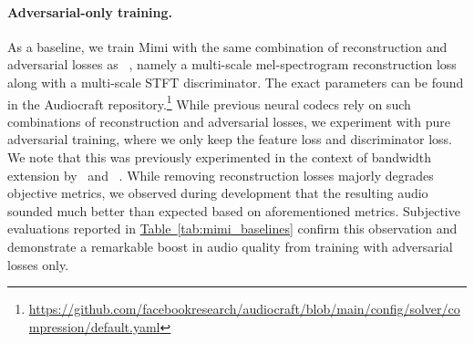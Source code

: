 \paragraph{Adversarial-only training.}
As a baseline, we train Mimi with the same combination of reconstruction and adversarial losses as ~\citet{encodec}, namely a multi-scale mel-spectrogram reconstruction loss along with a multi-scale STFT discriminator. The exact parameters can be found in the Audiocraft repository.\footnote{\url{https://github.com/facebookresearch/audiocraft/blob/main/config/solver/compression/default.yaml}} While previous neural codecs rely on such combinations of reconstruction and adversarial losses, we experiment with pure adversarial training, where we only keep the feature loss and discriminator loss. We note that this was previously experimented in the context of bandwidth extension by~\citet{tagliasacchi2020seanet} and ~\citet{hauret2023eben}. While removing reconstruction losses majorly degrades objective metrics, we observed during development that the resulting audio sounded much better than expected based on aforementioned metrics. Subjective evaluations reported in \hyperref[tab:mimi_baselines]{Table~\ref{tab:mimi_baselines}} confirm this observation and demonstrate a remarkable boost in audio quality from training with adversarial losses only.

